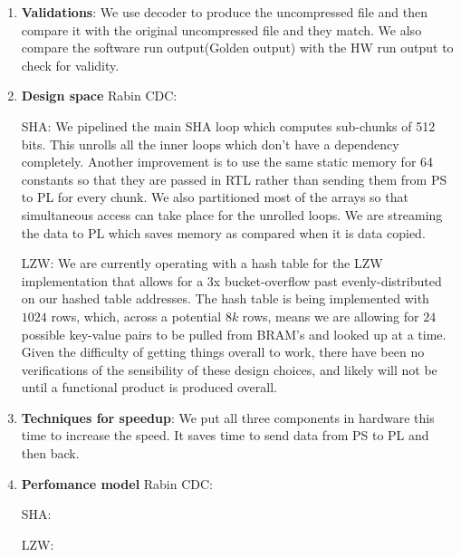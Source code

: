 \documentclass{article}
\begin{document}
\begin{enumerate}
\item%
\textbf{Validations}: We use decoder to produce the uncompressed file and then compare it with the original uncompressed file and they match. 
We also compare the software run output(Golden output) with the HW run output to check for validity. 
\newline

\item%
\textbf{Design space}\newline
Rabin CDC:\newline

\newline
SHA:\newline
 We pipelined the main SHA loop which computes sub-chunks of 512 bits. This unrolls all the inner loops which don't have a dependency completely. 
 Another improvement is to use the same static memory for 64 constants so that they are passed in RTL rather than sending them from PS to PL for every chunk.
 We also partitioned most of the arrays so that simultaneous access can take place for the unrolled loops. 
 We are streaming the data to PL which saves memory as compared when it is data copied. 
\newline

LZW:\newline
We are currently operating with a hash table for the LZW implementation that allows for a 3x bucket-overflow past evenly-distributed on our hashed table addresses. The hash table is being implemented with $1024$ rows, which, across a potential $8k$ rows, means we are allowing for $24$ possible key-value pairs to be pulled from BRAM's and looked up at a time. 
Given the difficulty of getting things overall to work, there have been no verifications of the sensibility of these design choices, and likely will not be until a functional product is produced overall.

\newline

\item%
\textbf{Techniques for speedup}: We put all three components in hardware this time to increase the speed. It saves time to send data from PS to PL and then back. 
\newline


\item%
\textbf{Perfomance model}
Rabin CDC:


SHA:


LZW:
\newline



\end{enumerate}
\end{document}
